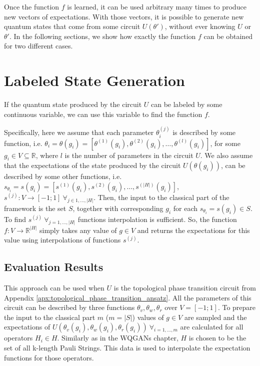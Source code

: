 Once the function $f$ is learned, it can be used arbitrary many times to produce
new vectors of expectations.
With those vectors, it is possible to generate new quantum states that come from
some circuit $U(\theta')$, without ever knowing $U$ or $\theta'$.
In the following sections, we show how exactly the function $f$ can be obtained
for two different cases. 
\section{Labeled State Generation}
If the quantum state produced by the circuit $U$ can be labeled by some continuous
variable, we can use this variable to find the function $f$.

Specifically, here we assume that each parameter $\theta_i^{(j)}$ is described by some
function, i.e. $\theta_i = \theta(g_i) = [\theta^{(1)}(g_i), \theta^{(2)}(g_i), \ldots,
\theta^{(l)}(g_i)]$, for some $g_i \in V \subseteq 
\mathbb{R}$, where $l$ is the number of parameters in the circuit $U$.
We also assume that the expectations of the state produced by the
circuit $U(\theta(g_i))$, can be described by some other functions,
i.e. $s_{\theta_i} = s(g_i) = [s^{(1)}(g_i), s^{(2)}(g_i), \ldots,
s^{(|H|)}(g_i)]$, $s^{(j)}: V \to [-1; 1]\ \forall_{j \in 1,\ldots,|H|}$.
Then, the input to the classical part of the framework is the set $S$, together with
corresponding $g_i$ for each $s_{\theta_i} = s(g_i) \in S$.
To find $s^{(j)}\ \forall_{j=1,\ldots,|H|}$ functions interpolation is
sufficient. So, the function $f: V \to \mathbb{R}^{|H|}$ simply takes
any value of $g \in V$ and returns the expectations for this value using
interpolations of functions $s^{(j)}$.

\subsection{Evaluation Results}
This approach can be used when $U$ is the topological phase transition circuit from
Appendix \ref{apx:topological_phase_transition_ansatz}. All the parameters of
this circuit can be described by three functions $\theta_v, \theta_w, \theta_r$
over $V = [-1; 1]$. To prepare the input to the classical part 
 $m$ ($m = |S|$) values of $g \in V$ are sampled and the expectations of $U(\theta_v(g_i),
\theta_w(g_i), \theta_r(g_i))\ \forall_{i=1,\ldots,m}$ are calculated for all operators $H_i
\in H$. Similarly as in the WQGANs chapter, $H$ is chosen to be the
set of all k-length Pauli Strings.
This data is used to interpolate the expectation functions for those operators.  

